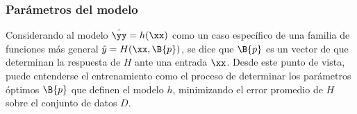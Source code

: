 %
\subsubsection{Parámetros del modelo}
%
Considerando al modelo $\hat{\yy}=h(\xx)$ como un caso específico
de una familia de funciones más general $\hat{y}=H(\xx,\B{p})$, se dice
que $\B{p}$ es un vector de  que determinan la respuesta
de $H$ ante una entrada $\xx$.
Desde este punto de vista, puede entenderse el {entrenamiento} como el
proceso de determinar los parámetros óptimos $\B{p}$ que definen el modelo
$h$, minimizando el error promedio de $H$ sobre el conjunto de datos $D$.
